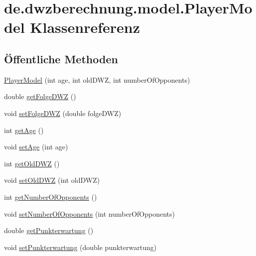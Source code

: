 \hypertarget{classde_1_1dwzberechnung_1_1model_1_1_player_model}{}\section{de.\+dwzberechnung.\+model.\+Player\+Model Klassenreferenz}
\label{classde_1_1dwzberechnung_1_1model_1_1_player_model}
\subsection*{Öffentliche Methoden}
\begin{DoxyCompactItemize}
\item 
\hyperlink{classde_1_1dwzberechnung_1_1model_1_1_player_model_ab8768b36c01be5f95389f6b8d68d2cc0}{Player\+Model} (int age, int old\+D\+WZ, int number\+Of\+Opponents)
\item 
double \hyperlink{classde_1_1dwzberechnung_1_1model_1_1_player_model_acbefff4c9ad7eff28a79c26727e1002c}{get\+Folge\+D\+WZ} ()
\item 
void \hyperlink{classde_1_1dwzberechnung_1_1model_1_1_player_model_af7642769ccd2b3d3a5b9ac09564e2196}{set\+Folge\+D\+WZ} (double folge\+D\+WZ)
\item 
int \hyperlink{classde_1_1dwzberechnung_1_1model_1_1_player_model_a23e959d4c43b0b2d9675ce1bed2cd683}{get\+Age} ()
\item 
void \hyperlink{classde_1_1dwzberechnung_1_1model_1_1_player_model_a98af460de1ae5f115c53b4c895e7281a}{set\+Age} (int age)
\item 
int \hyperlink{classde_1_1dwzberechnung_1_1model_1_1_player_model_a57e4cfc994fb0576d4b6864ba30cac1a}{get\+Old\+D\+WZ} ()
\item 
void \hyperlink{classde_1_1dwzberechnung_1_1model_1_1_player_model_a5fc61acb22b85392ad54e22e83b1a73f}{set\+Old\+D\+WZ} (int old\+D\+WZ)
\item 
int \hyperlink{classde_1_1dwzberechnung_1_1model_1_1_player_model_af975393e47e9292aad2290585fd3d1fd}{get\+Number\+Of\+Opponents} ()
\item 
void \hyperlink{classde_1_1dwzberechnung_1_1model_1_1_player_model_a6cc946bd837a6e428cb3d40047aeeae0}{set\+Number\+Of\+Opponents} (int number\+Of\+Opponents)
\item 
double \hyperlink{classde_1_1dwzberechnung_1_1model_1_1_player_model_a98410f9c0d1c391500949b742a1ecdb2}{get\+Punkterwartung} ()
\item 
void \hyperlink{classde_1_1dwzberechnung_1_1model_1_1_player_model_ae4048ae8333aa17be01e086659b7363d}{set\+Punkterwartung} (double punkterwartung)

\end{DoxyCompactItemize}
